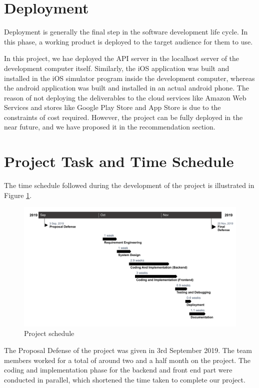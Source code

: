 \documentclass[12pt, a4paper, oneside]{article}
\begin{document}
\pagebreak
\section{Deployment}
Deployment is generally the final step in the software development life cycle. In this phase, a working product is deployed to the target audience for them to use.

In this project, we hae deployed the API server in the localhost server of the development computer itself. Similarly, the iOS application was built and installed in the iOS simulator program inside the development computer, whereas the android application was built and installed in an actual android phone. The reason of not deploying the deliverables to the cloud services like Amazon Web Services and stores like Google Play Store and App Store is due to the constraints of cost required. However, the project can be fully deployed in the near future, and we have proposed it in the recommendation section.

\pagebreak
\section{Project Task and Time Schedule}
The time schedule followed during the development of the project is illustrated in Figure \ref{fig:schedule}.

\begin{figure}[h!]
	\includegraphics[width=\linewidth]{schedule}
	\centering
	\caption{Project schedule}
	\label{fig:schedule}
\end{figure}

The Proposal Defense of the project was given in 3rd September 2019. The team members worked for a total of around two and a half month on the project. The coding and implementation phase for the backend and front end part were conducted in parallel, which shortened the time taken to complete our project.
\end{document}
